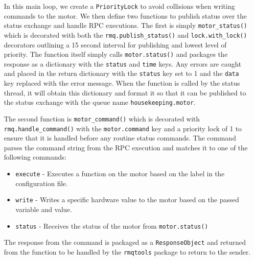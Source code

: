 In this main loop, we create a \texttt{PriorityLock} to avoid collisions when writing commands to the motor. 
We then define two functions to publish status over the status exchange and handle RPC executions.
The first is simply \texttt{motor\_status()} which is decorated with both the \texttt{rmq.publish\_status()} and \texttt{lock.with\_lock()} decorators outlining a 15 second interval for publishing and lowest level of priority.
The function itself simply calls \texttt{motor.status()} and packages the response as a dictionary with the \texttt{status} and \texttt{time} keys.
Any errors are caught and placed in the return dictionary with the \texttt{status} key set to 1 and the \texttt{data} key replaced with the error message.
When the function is called by the status thread, it will obtain this dictionary and format it so that it can be published to the status exchange with the queue name \texttt{housekeeping.motor}.

The second function is \texttt{motor\_command()} which is decorated with \texttt{rmq.handle\_command()} with the \texttt{motor.command} key and a priority lock of 1 to ensure that it is handled before any routine status commands.
The command parses the command string from the RPC execution and matches it to one of the following commands:
\begin{itemize}
    \item \texttt{execute} - Executes a function on the motor based on the label in the configuration file. 
    \item \texttt{write} - Writes a specific hardware value to the motor based on the passed variable and value.
    \item \texttt{status} - Receives the status of the motor from \texttt{motor.status()}
\end{itemize}
The response from the command is packaged as a \texttt{ResponseObject} and returned from the function to be handled by the \texttt{rmqtools} package to return to the sender. 

